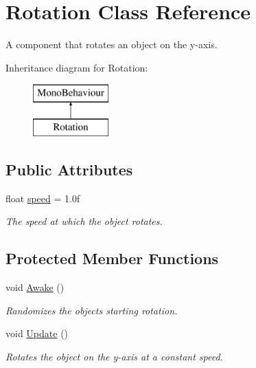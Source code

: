 \hypertarget{class_rotation}{}\section{Rotation Class Reference}
\label{class_rotation}


A component that rotates an object on the y-\/axis.  


Inheritance diagram for Rotation\+:\begin{figure}[H]
\begin{center}
\leavevmode
\includegraphics[height=2.000000cm]{class_rotation}
\end{center}
\end{figure}
\subsection*{Public Attributes}
\begin{DoxyCompactItemize}
\item 
float \mbox{\hyperlink{class_rotation_a9f02f6a4f4552b25304ae090cf65d5e3}{speed}} = 1.\+0f
\begin{DoxyCompactList}\small\item\em The speed at which the object rotates. \end{DoxyCompactList}\end{DoxyCompactItemize}
\subsection*{Protected Member Functions}
\begin{DoxyCompactItemize}
\item 
void \mbox{\hyperlink{class_rotation_adf4d306096c84d6cf221555cb6150d0f}{Awake}} ()
\begin{DoxyCompactList}\small\item\em Randomizes the object\textquotesingle{}s starting rotation. \end{DoxyCompactList}\item 
void \mbox{\hyperlink{class_rotation_a0bca908326feb819b54464ad1d600dc8}{Update}} ()
\begin{DoxyCompactList}\small\item\em Rotates the object on the y-\/axis at a constant speed. \end{DoxyCompactList}\end{DoxyCompactItemize}


